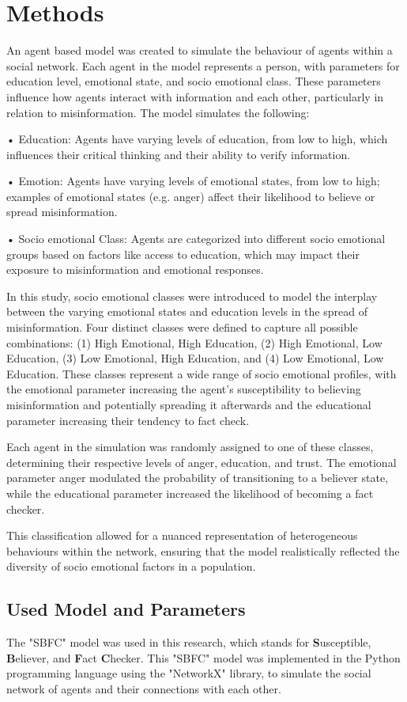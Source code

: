 \documentclass[twocolumn, a4paper, 12pt]{article}
\begin{document}
\section{Methods}
An agent based model was created to simulate the behaviour of agents within a social network. Each agent in the model represents a person, with parameters for education level, emotional state, and socio emotional class. These parameters influence how agents interact with information and each other, particularly in relation to misinformation. The model simulates the following:

• Education: Agents have varying levels of education, from low to high, which
influences their critical thinking and their ability to verify information.

• Emotion: Agents have varying levels of emotional states, from low to high; examples of emotional states (e.g. anger) affect their likelihood to believe or spread misinformation.

• Socio emotional Class: Agents are categorized into different socio emotional groups based on factors like access to education, which may impact their exposure to misinformation and emotional responses.

In this study, socio emotional classes were introduced to model the interplay between the varying emotional states and education levels in the spread of misinformation. Four distinct classes were defined to capture all possible combinations: (1) High Emotional, High Education, (2) High Emotional, Low Education, (3) Low Emotional, High Education, and (4) Low Emotional, Low Education. These classes represent a wide range of socio emotional profiles, with the emotional parameter increasing the agent's susceptibility to believing misinformation and potentially spreading it afterwards and the educational parameter increasing their tendency to fact check.

Each agent in the simulation was randomly assigned to one of these classes, determining their respective levels of anger, education, and trust. The emotional parameter anger modulated the probability of transitioning to a believer state, while the educational parameter increased the likelihood of becoming a fact checker.

This classification allowed for a nuanced representation of heterogeneous behaviours within the network, ensuring that the model realistically reflected the diversity of socio emotional factors in a population.

\subsection{Used Model and Parameters}
The "SBFC" model \cite{simulation} was used in this research, which stands for \textbf{S}usceptible, \textbf{B}eliever, and \textbf{F}act \textbf{C}hecker. This "SBFC" model was implemented in the Python programming language using the "NetworkX" library, to simulate the social network of agents and their connections with each other.
\end{document}
